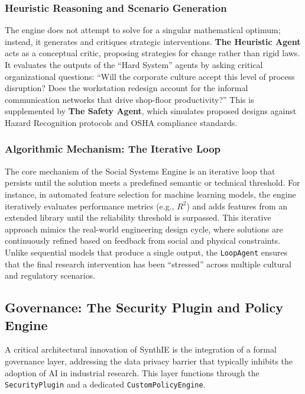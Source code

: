 \documentclass[12pt,a4paper]{article}
\begin{document}
\subsubsection{Heuristic Reasoning and Scenario Generation}

The engine does not attempt to solve for a singular mathematical optimum; instead, it generates and critiques strategic interventions. \textbf{The Heuristic Agent} acts as a conceptual critic, proposing strategies for change rather than rigid laws. It evaluates the outputs of the ``Hard System'' agents by asking critical organizational questions: ``Will the corporate culture accept this level of process disruption? Does the workstation redesign account for the informal communication networks that drive shop-floor productivity?'' This is supplemented by \textbf{The Safety Agent}, which simulates proposed designs against Hazard Recognition protocols and OSHA compliance standards.

\subsubsection{Algorithmic Mechanism: The Iterative Loop}

The core mechanism of the Social Systems Engine is an iterative loop that persists until the solution meets a predefined semantic or technical threshold. For instance, in automated feature selection for machine learning models, the engine iteratively evaluates performance metrics (e.g., $R^2$) and adds features from an extended library until the reliability threshold is surpassed. This iterative approach mimics the real-world engineering design cycle, where solutions are continuously refined based on feedback from social and physical constraints. Unlike sequential models that produce a single output, the \texttt{LoopAgent} ensures that the final research intervention has been ``stressed'' across multiple cultural and regulatory scenarios.

\subsection{Governance: The Security Plugin and Policy Engine}

A critical architectural innovation of SynthIE is the integration of a formal governance layer, addressing the data privacy barrier that typically inhibits the adoption of AI in industrial research. This layer functions through the \texttt{SecurityPlugin} and a dedicated \texttt{CustomPolicyEngine}.
\end{document}
